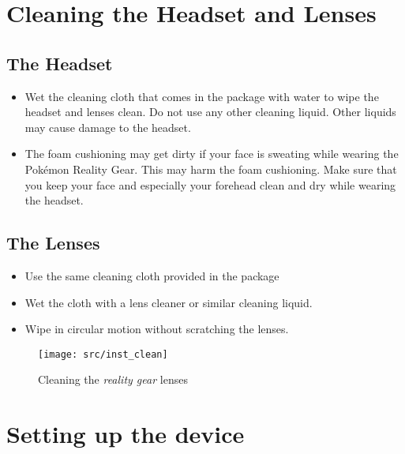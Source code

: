 \section{Cleaning the Headset and Lenses}

\subsection*{The Headset}
\begin{itemize}
\item Wet the cleaning cloth that comes in the package with water to wipe the headset and lenses clean. Do not use any other cleaning liquid. Other liquids may cause damage to the headset.
\item	The foam cushioning may get dirty if your face is sweating while wearing the Pokémon Reality Gear. This may harm the foam cushioning. Make sure that you keep your face and especially your forehead clean and dry while wearing the headset.
\end{itemize}

\subsection*{The Lenses}
\begin{itemize}
\item Use the same cleaning cloth provided in the package
\item Wet the cloth with a lens cleaner or similar cleaning liquid.
\item Wipe in circular motion without scratching the lenses.
\end{itemize}
\begin{figure}[!ht]
\begin{center}
\texttt{[image: src/inst\_clean]}
\end{center}
\caption[Cleaning the \emph{\pokeT{} reality gear} lenses]{Cleaning the \emph{\poke{} reality gear} lenses}
\label{gear_clean}
\end{figure}

\section{Setting up the device}

